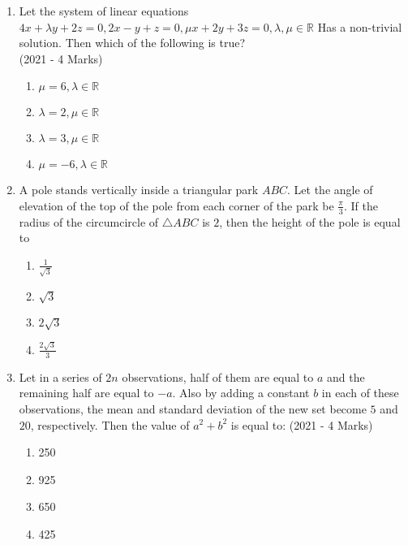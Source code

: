 \documentclass[journal]{IEEEtran}
\begin{document}
    \begin{enumerate}
    \item{
          	Let the system of linear equations
          	$4x + \lambda y + 2z = 0,
          	2x - y + z = 0,
          	\mu x + 2y + 3z = 0, \lambda, \mu \in \mathbb{R}$
          	Has a non-trivial solution. Then which of the following is true?\\ \text{  }\hfill
                {(2021 - 4 Marks)}
                \begin{multicols}{2}
					\begin{enumerate}
						\item $\mu = 6, \lambda \in \mathbb{R}$
						\item $\lambda = 2, \mu \in \mathbb{R}$
						\item $\lambda = 3, \mu \in \mathbb{R}$
						\item $\mu = -6, \lambda \in \mathbb{R}$
					\end{enumerate}
				\end{multicols}
            }
    \item{
           	A pole stands vertically inside a triangular park $ABC$. Let the angle of elevation of the top of the pole from each corner of the park be $\frac{\pi}{3}$. If the radius of the circumcircle of $\triangle ABC$ is $2$, then the height of the pole is equal to
                \begin{multicols}{4}
                	\begin{enumerate}
                			\item $\frac{1}{\sqrt{3}}$
                			
                			\item $\sqrt{3}$
                			
                			\item $2\sqrt{3}$
                			
                			\item $\frac{2\sqrt{3}}{3}$
                	\end{enumerate}
                \end{multicols}
        }
\item{
        	
        	Let in a series of $2n$ observations, half of them are equal to $a$ and the remaining half are equal to $-a$. Also by adding a constant $b$ in each of these observations, the mean and standard deviation of the new set become $5$ and $20$, respectively. Then the value of $a^2 + b^2$ is equal to:
        	\hfill
        	{(2021 - 4 Marks)}
        	\begin{multicols}{4}
        		\begin{enumerate}
        			\item 250
        			\item 925
        			\item 650
        			\item 425
        		\end{enumerate}
        	\end{multicols}
        	
}
\end{enumerate}
\end{document}
